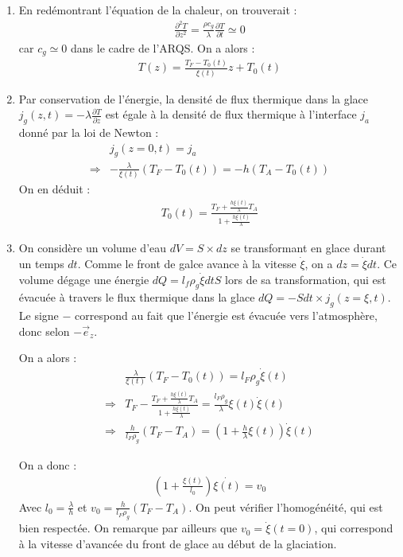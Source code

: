 \begin{correction}

\begin{enumerate}

	\item En redémontrant l'équation de la chaleur, on trouverait :
	\begin{align*}
		\frac{\partial^2 T}{\partial z^2} = \frac{\rho c_g}{\lambda}\frac{\partial T}{\partial t} \simeq0
	\end{align*}
	car $c_g\simeq0$ dans le cadre de l'ARQS. On a alors :
	\begin{align*}
		T(z) = \frac{T_F-T_0(t)}{\xi(t)}z+T_0(t)
	\end{align*}
	
	\item Par conservation de l'énergie, la densité de flux thermique dans la glace $j_g(z,t)=-\lambda\frac{\partial T}{\partial z}$ est égale à la densité de flux thermique à l'interface $j_a$ donné par la loi de Newton :
	\begin{align*}
		& j_g(z=0,t)=j_a \\
		\Rightarrow & -\frac{\lambda}{\xi(t)}(T_F-T_0(t))=-h(T_A-T_0(t))
	\end{align*}
	On en déduit :
	\begin{align*}
		T_0(t)=\frac{T_F+\frac{h\xi(t)}{\lambda}T_A}{1+\frac{h\xi(t)}{\lambda}}
	\end{align*}
	
	\item On considère un volume d'eau $dV=S\times dz$ se transformant en glace durant un temps $dt$. Comme le front de galce avance à la vitesse $\dot{\xi}$, on a $dz=\dot{\xi}dt$. Ce volume dégage une énergie $dQ=l_f\rho_g\dot{\xi}dtS$ lors de sa transformation, qui est évacuée à travers le flux thermique dans la glace $dQ = -Sdt\times j_g(z=\xi,t)$. Le signe $-$ correspond au fait que l'énergie est évacuée vers l'atmosphère, donc selon $-\vec{e}_z$.
	
	On a alors : 
	\begin{align*}
		&\frac{\lambda}{\xi(t)}(T_F-T_0(t))=l_F\rho_g\dot{\xi}(t) \\
		\Rightarrow & T_F-\frac{T_F+\frac{h\xi(t)}{\lambda}T_A}{1+\frac{h\xi(t)}{\lambda}} =\frac{l_F\rho_g}{\lambda} \xi(t)\dot{\xi}(t) \\
		\Rightarrow & \frac{h}{l_F\rho_g}(T_F-T_A)=\left(1+\frac{h}{\lambda}\xi(t) \right) \dot{\xi}(t)
	\end{align*}
	
	On a donc :
	\begin{align*}
		\left( 1+\frac{\xi(t)}{l_0}\right) \dot{\xi(t)}=v_0
	\end{align*}
	Avec $l_0=\frac{\lambda}{h}$ et $v_0=\frac{h}{l_F\rho_g}(T_F-T_A)$. On peut vérifier l'homogénéité, qui est bien respectée. On remarque par ailleurs que $v_0=\dot{\xi}(t=0)$, qui correspond à la vitesse d'avancée du front de glace au début de la glaciation.
	

\end{enumerate}
\end{correction}
